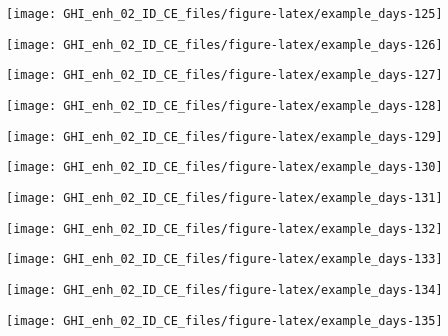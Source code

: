 \documentclass[
  10pt,
  a4paper,oneside]{article}
\begin{document}
\begin{center}\texttt{[image: GHI\_enh\_02\_ID\_CE\_files/figure-latex/example\_days-125]} \end{center}

\begin{center}\texttt{[image: GHI\_enh\_02\_ID\_CE\_files/figure-latex/example\_days-126]} \end{center}

\begin{center}\texttt{[image: GHI\_enh\_02\_ID\_CE\_files/figure-latex/example\_days-127]} \end{center}

\begin{center}\texttt{[image: GHI\_enh\_02\_ID\_CE\_files/figure-latex/example\_days-128]} \end{center}

\begin{center}\texttt{[image: GHI\_enh\_02\_ID\_CE\_files/figure-latex/example\_days-129]} \end{center}

\begin{center}\texttt{[image: GHI\_enh\_02\_ID\_CE\_files/figure-latex/example\_days-130]} \end{center}

\begin{center}\texttt{[image: GHI\_enh\_02\_ID\_CE\_files/figure-latex/example\_days-131]} \end{center}

\begin{center}\texttt{[image: GHI\_enh\_02\_ID\_CE\_files/figure-latex/example\_days-132]} \end{center}

\begin{center}\texttt{[image: GHI\_enh\_02\_ID\_CE\_files/figure-latex/example\_days-133]} \end{center}

\begin{center}\texttt{[image: GHI\_enh\_02\_ID\_CE\_files/figure-latex/example\_days-134]} \end{center}

\begin{center}\texttt{[image: GHI\_enh\_02\_ID\_CE\_files/figure-latex/example\_days-135]} \end{center}
\end{document}
